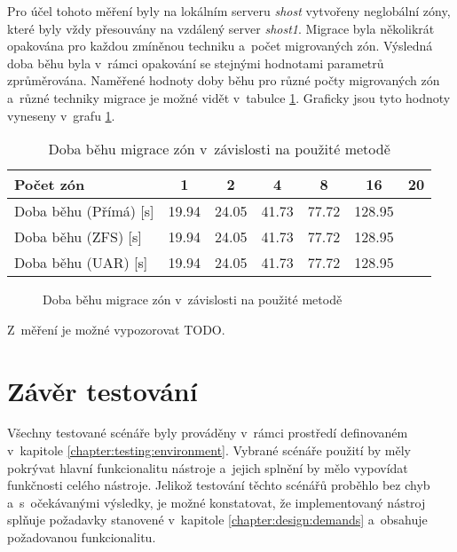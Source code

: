 Pro účel tohoto měření byly na lokálním serveru \textit{shost} vytvořeny neglobální zóny, které byly vždy přesouvány na vzdálený
server \textit{shost1}. Migrace byla několikrát opakována pro každou zmíněnou techniku a~počet migrovaných zón. Výsledná
doba běhu byla v~rámci opakování se stejnými hodnotami parametrů zprůměrována. Naměřené hodnoty doby běhu pro různé počty
migrovaných zón a~různé techniky migrace je možné vidět v~tabulce \ref{table:measuremet:migration}. Graficky jsou tyto
hodnoty vyneseny v~grafu \ref{graph:measuremet:migration}.
\begin{table}
  \centering
  \label{table:measuremet:migration}
  \caption{Doba běhu migrace zón v~závislosti na použité metodě}
  \begin{tabular}{ l | c c c c c c}
   Počet zón & 1 & 2 & 4 & 8 & 16 & 20  \\ \hline
   Doba běhu (Přímá) [s] & 19.94 & 24.05 & 41.73 & 77.72 & 128.95 & \\
   Doba běhu (ZFS) [s] & 19.94 & 24.05 & 41.73 & 77.72 & 128.95 & \\
   Doba běhu (UAR) [s] & 19.94 & 24.05 & 41.73 & 77.72 & 128.95 & \\
  \end{tabular}
\end{table}

\begin{figure}
  \centering
  \label{graph:measuremet:migration}
  \caption{Doba běhu migrace zón v~závislosti na použité metodě}
\end{figure}

Z~měření je možné vypozorovat TODO.
\section{Závěr testování}
\label{chapter:testing:scenario:conclusion}
Všechny testované scénáře byly prováděny v~rámci prostředí definovaném v~kapitole \ref{chapter:testing:environment}. Vybrané 
scénáře použití by měly pokrývat hlavní funkcionalitu nástroje a~jejich splnění by mělo vypovídat funkčnosti celého nástroje.
Jelikož testování těchto scénářů proběhlo bez chyb a~s~očekávanými výsledky, je možné konstatovat, že implementovaný nástroj
splňuje požadavky stanovené v~kapitole \ref{chapter:design:demands} a~obsahuje požadovanou funkcionalitu.